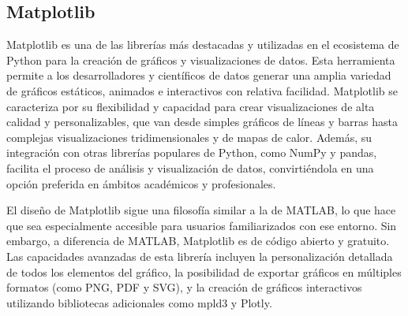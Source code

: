 \subsection{Matplotlib}

Matplotlib es una de las librerías más destacadas y utilizadas en el ecosistema de Python para la creación de gráficos y visualizaciones de datos. Esta herramienta permite a los desarrolladores y científicos de datos generar una amplia variedad de gráficos estáticos, animados e interactivos con relativa facilidad. Matplotlib se caracteriza por su flexibilidad y capacidad para crear visualizaciones de alta calidad y personalizables, que van desde simples gráficos de líneas y barras hasta complejas visualizaciones tridimensionales y de mapas de calor. Además, su integración con otras librerías populares de Python, como NumPy y pandas, facilita el proceso de análisis y visualización de datos, convirtiéndola en una opción preferida en ámbitos académicos y profesionales.

El diseño de Matplotlib sigue una filosofía similar a la de MATLAB, lo que hace que sea especialmente accesible para usuarios familiarizados con ese entorno. Sin embargo, a diferencia de MATLAB, Matplotlib es de código abierto y gratuito. Las capacidades avanzadas de esta librería incluyen la personalización detallada de todos los elementos del gráfico, la posibilidad de exportar gráficos en múltiples formatos (como PNG, PDF y SVG), y la creación de gráficos interactivos utilizando bibliotecas adicionales como mpld3 y Plotly. 





